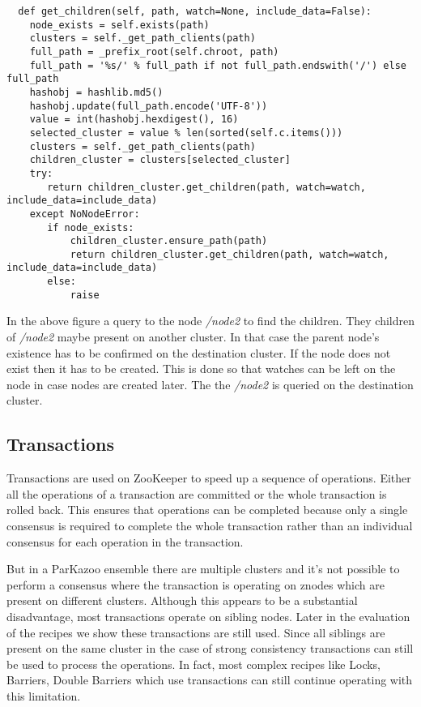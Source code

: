 \begin{lstlisting}
  def get_children(self, path, watch=None, include_data=False):
    node_exists = self.exists(path)
    clusters = self._get_path_clients(path)
    full_path = _prefix_root(self.chroot, path)
    full_path = '%s/' % full_path if not full_path.endswith('/') else full_path
    hashobj = hashlib.md5()
    hashobj.update(full_path.encode('UTF-8'))
    value = int(hashobj.hexdigest(), 16)
    selected_cluster = value % len(sorted(self.c.items()))
    clusters = self._get_path_clients(path)
    children_cluster = clusters[selected_cluster]
    try:
       return children_cluster.get_children(path, watch=watch, include_data=include_data)
    except NoNodeError:
       if node_exists:
           children_cluster.ensure_path(path)
           return children_cluster.get_children(path, watch=watch, include_data=include_data)
       else:
           raise
\end{lstlisting}



In the above figure a query to the node \textit{/node2} to find the children. They children of \textit{/node2} maybe present on another cluster. In that case the parent node's existence has to be confirmed on the destination cluster. If the node does not exist then it has to be created. This is done so that watches can be left on the node in case nodes are created later. The the \textit{/node2} is queried on the destination cluster.

\subsection{Transactions}
Transactions are used on ZooKeeper to speed up a sequence of operations. Either all the operations of a transaction are committed or the whole transaction is rolled back. This ensures that operations can be completed because only a single consensus is required to complete the whole transaction rather than an individual consensus for each operation in the transaction.
    
But in a ParKazoo ensemble there are multiple clusters and it's not possible to perform a consensus where the transaction is operating on znodes which are present on different clusters. Although this appears to be a substantial disadvantage, most transactions operate on sibling nodes. Later in the evaluation of the recipes we show these transactions are still used. Since all siblings are present on the same cluster in the case of strong consistency transactions can still be used to process the operations. In fact, most complex recipes like Locks, Barriers, Double Barriers which use transactions can still continue operating with this limitation.
    
